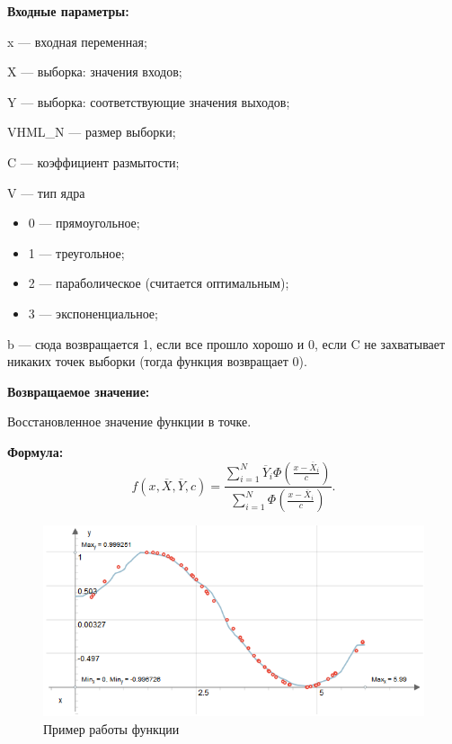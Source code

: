 \textbf{Входные параметры:} 
 
x --- входная переменная;
 
X --- выборка: значения входов;
 
Y --- выборка: соответствующие значения выходов;
 
VHML\_N --- размер выборки;
 
C --- коэффициент размытости;
 
V --- тип ядра
 
 \begin{itemize}
 \item  0 --- прямоугольное;
 \item  1 --- треугольное;
 \item  2 --- параболическое (считается оптимальным);
 \item   3 --- экспоненциальное;
 \end{itemize}
 
b --- сюда возвращается 1, если все прошло хорошо и 0, если C не захватывает никаких точек выборки (тогда функция возвращает 0).

\textbf{Возвращаемое значение:}
 
Восстановленное значение функции в точке.

\textbf{Формула:}
\begin{equation*}
f\left( x, \overline{X},\overline{Y}, c\right) =\dfrac{\sum_{i=1}^{N}\overline{Y}_i\Phi\left( \frac{x-\overline{X}_i}{c}\right) }{\sum_{i=1}^{N}\Phi\left( \frac{x-\overline{X}_i}{c}\right) }.
\end{equation*}

 \begin{figure} [h] 
   \center
   \includegraphics {HML_NonparametricEstimatorOfRegression.png}
   \caption{Пример работы функции} 
   \label{img:HML_NonparametricEstimatorOfRegression}  
 \end{figure}